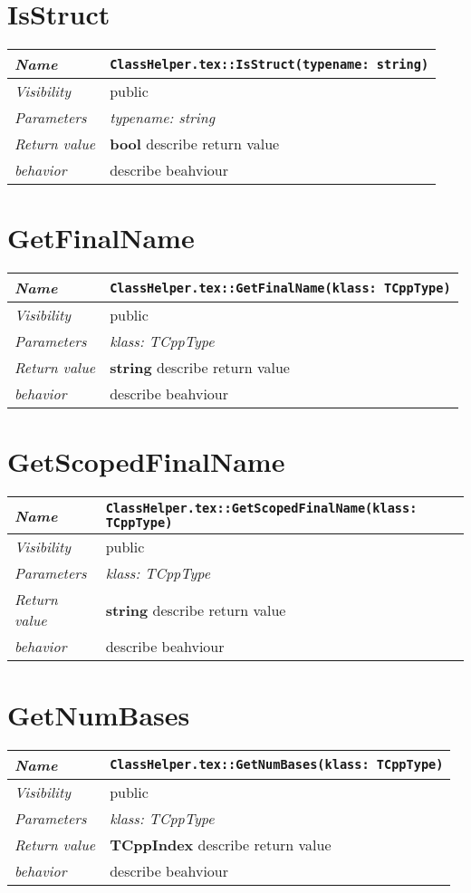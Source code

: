  \section{IsStruct}
\begin{longtable}{p{3cm} @{\hskip 1cm} p{12cm}}
 \hline
\textit{Name} & \texttt{ClassHelper.tex::IsStruct(typename: string)}\\
\hline
 \textit{Visibility} & public\\
\hline
\textit{Parameters} & \textit{typename: string}\\
\hline
\textit{Return value} & \textbf{ bool} describe return value\\
  \hline
 \textit{behavior} & describe beahviour \\
\hline
\end{longtable} \pagebreak
 \section{GetFinalName}
\begin{longtable}{p{3cm} @{\hskip 1cm} p{12cm}}
 \hline
\textit{Name} & \texttt{ClassHelper.tex::GetFinalName(klass: TCppType)}\\
\hline
 \textit{Visibility} & public\\
\hline
\textit{Parameters} & \textit{klass: TCppType}\\
\hline
\textit{Return value} & \textbf{ string} describe return value\\
  \hline
 \textit{behavior} & describe beahviour \\
\hline
\end{longtable} \pagebreak
 \section{GetScopedFinalName}
\begin{longtable}{p{3cm} @{\hskip 1cm} p{12cm}}
 \hline
\textit{Name} & \texttt{ClassHelper.tex::GetScopedFinalName(klass: TCppType)}\\
\hline
 \textit{Visibility} & public\\
\hline
\textit{Parameters} & \textit{klass: TCppType}\\
\hline
\textit{Return value} & \textbf{ string} describe return value\\
  \hline
 \textit{behavior} & describe beahviour \\
\hline
\end{longtable} \pagebreak
 \section{GetNumBases}
\begin{longtable}{p{3cm} @{\hskip 1cm} p{12cm}}
 \hline
\textit{Name} & \texttt{ClassHelper.tex::GetNumBases(klass: TCppType)}\\
\hline
 \textit{Visibility} & public\\
\hline
\textit{Parameters} & \textit{klass: TCppType}\\
\hline
\textit{Return value} & \textbf{ TCppIndex} describe return value\\
  \hline
 \textit{behavior} & describe beahviour \\
\hline
\end{longtable} \pagebreak
